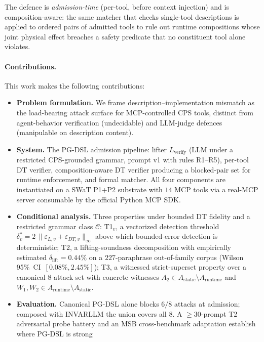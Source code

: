 The defence is \emph{admission-time} (per-tool, before context
injection) and is composition-aware: the same matcher that checks
single-tool descriptions is applied to ordered pairs of admitted tools
to rule out runtime compositions whose joint physical effect breaches
a safety predicate that no constituent tool alone violates.

\paragraph{Contributions.}
This work makes the following contributions:
\begin{itemize}
\item \textbf{Problem formulation.} We frame
      description--implementation mismatch as the load-bearing attack
      surface for MCP-controlled CPS tools, distinct from
      agent-behavior verification (undecidable) and LLM-judge
      defences (manipulable on description content).
\item \textbf{System.} The PG-DSL admission pipeline:
      lifter $L_{\text{verify}}$ (LLM under a restricted CPS-grounded
      grammar, prompt v1 with rules R1--R5), per-tool DT verifier,
      composition-aware DT verifier producing a blocked-pair set for
      runtime enforcement, and formal matcher. All four components
      are instantiated on a SWaT P1+P2 substrate with $14$ MCP tools
      via a real-MCP server consumable by the official Python MCP
      SDK.
\item \textbf{Conditional analysis.} Three properties under bounded
      DT fidelity and a restricted grammar class $\mathcal{C}$:
      T1${}_v$, a vectorized detection threshold $\delta^{*}_v =
      2\,\|\varepsilon_{L,v} + \varepsilon_{DT,v}\|_\infty$ above which
      bounded-error detection is deterministic; T2, a
      lifting-soundness decomposition with empirically estimated
      $\delta_{\text{lift}} = 0.44\%$ on a $227$-paraphrase
      out-of-family corpus (Wilson 95\%~CI~$[0.08\%, 2.45\%]$); T3,
      a witnessed strict-superset property over a canonical
      $8$-attack set with concrete witnesses $A_2 \in
      A_{\text{static}} \setminus A_{\text{runtime}}$ and
      $W_1, W_2 \in A_{\text{runtime}} \setminus A_{\text{static}}$.
\item \textbf{Evaluation.} Canonical PG-DSL alone blocks $6/8$ attacks
      at admission; composed with INVARLLM the union covers all $8$.
      A $\geq 30$-prompt T2 adversarial probe battery and an MSB
      cross-benchmark adaptation establish where PG-DSL is strong

\end{itemize}
